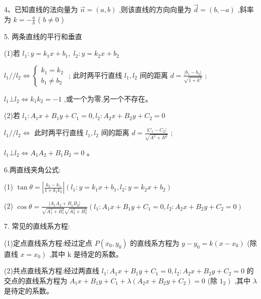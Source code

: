 \documentclass[10pt]{article}
\begin{document}
4、已知直线的法向量为 \(\overrightarrow{n} = \left( {a,b}\right)\) ,则该直线的方向向量为 \(\overrightarrow{d} = \left( {b, - a}\right)\) ,斜率为 \(k =  - \frac{a}{b}\) ( \(b \neq  0\) )

5. 两条直线的平行和垂直

(1)若 \({l}_{1} : y = {k}_{1}x + {b}_{1},\;{l}_{2} : y = {k}_{2}x + {b}_{2}\)

\({l}_{1}//{l}_{2} \Leftrightarrow  \left\{  \begin{array}{l} {k}_{1} = {k}_{2} \\  {b}_{1} \neq  {b}_{2} \end{array}\right.\) ; 此时两平行直线 \({l}_{1},{l}_{2}\) 间的距离 \(d = \frac{\left| {b}_{1} - {b}_{2}\right| }{\sqrt{1 + {k}^{2}}}\) ;

\({l}_{1} \bot  {l}_{2} \Leftrightarrow  {k}_{1}{k}_{2} =  - 1\) ,或一个为零,另一个不存在。

(2)若 \({l}_{1} : {A}_{1}x + {B}_{1}y + {C}_{1} = 0,{l}_{2} : {A}_{2}x + {B}_{2}y + {C}_{2} = 0\)

\({l}_{1}//{l}_{2} \Leftrightarrow\) 此时两平行直线 \({l}_{1},{l}_{2}\) 间的距离 \(d = \frac{\left| {C}_{1} - {C}_{2}\right| }{\sqrt{{A}^{2} + {B}^{2}}}\) ;

\({l}_{1} \bot  {l}_{2} \Leftrightarrow  {A}_{1}{A}_{2} + {B}_{1}{B}_{2} = 0\) 。

6.两直线夹角公式:

(1) \(\tan \theta  = \left| \frac{{k}_{2} - {k}_{1}}{1 + {k}_{1}{k}_{2}}\right| \left( {{l}_{1} : y = {k}_{1}x + {b}_{1},{l}_{2} : y = {k}_{2}x + {b}_{2}}\right)\)

(2) \(\cos \theta  = \frac{\left| {A}_{1}{A}_{2} + {B}_{1}{B}_{2}\right| }{\sqrt{{A}_{1}^{2} + {B}_{1}^{2}}\sqrt{{A}_{2}^{2} + {B}_{2}^{2}}}\left( {{l}_{1} : {A}_{1}x + {B}_{1}y + {C}_{1} = 0,{l}_{2} : {A}_{2}x + {B}_{2}y + {C}_{2} = 0}\right)\)

7. 常见的直线系方程:

(1)定点直线系方程:经过定点 \(P\left( {{x}_{0},{y}_{0}}\right)\) 的直线系方程为 \(y - {y}_{0} = k\left( {x - {x}_{0}}\right)\) (除直线 \(\left. {x = {x}_{0}}\right)\) ,其中 \(\mathrm{k}\) 是待定的系数。

(2)共点直线系方程:经过两直线 \({l}_{1} : {A}_{1}x + {B}_{1}y + {C}_{1} = 0,{l}_{2} : {A}_{2}x + {B}_{2}y + {C}_{2} = 0\) 的交点的直线系方程为 \({A}_{1}x + {B}_{1}y + {C}_{1} + \lambda \left( {{A}_{2}x + {B}_{2}y + {C}_{2}}\right)  = 0\) (除 \(\left. {1}_{2}\right)\) ,其中 \(\lambda\) 是待定的系数。
\end{document}

